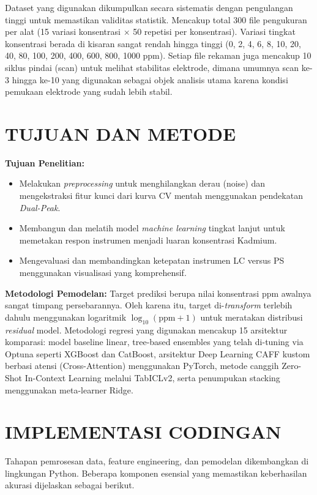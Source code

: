 \documentclass[10pt, twocolumn, a4paper]{article}
\begin{document}
Dataset yang digunakan dikumpulkan secara sistematis dengan pengulangan tinggi untuk memastikan validitas statistik. Mencakup total 300 file pengukuran per alat (15 variasi konsentrasi $\times$ 50 repetisi per konsentrasi). Variasi tingkat konsentrasi berada di kisaran sangat rendah hingga tinggi (0, 2, 4, 6, 8, 10, 20, 40, 80, 100, 200, 400, 600, 800, 1000 ppm). Setiap file rekaman juga mencakup 10 siklus pindai (scan) untuk melihat stabilitas elektrode, dimana umumnya scan ke-3 hingga ke-10 yang digunakan sebagai objek analisis utama karena kondisi pemukaan elektrode yang sudah lebih stabil.

\section{TUJUAN DAN METODE}
\textbf{Tujuan Penelitian:}
\begin{itemize}
    \item Melakukan \textit{preprocessing} untuk menghilangkan derau (noise) dan mengekstraksi fitur kunci dari kurva CV mentah menggunakan pendekatan \textit{Dual-Peak}.
    \item Membangun dan melatih model \textit{machine learning} tingkat lanjut\cite{sklearn} untuk memetakan respon instrumen menjadi luaran konsentrasi Kadmium.
    \item Mengevaluasi dan membandingkan ketepatan instrumen LC versus PS menggunakan visualisasi yang komprehensif.
\end{itemize}

\textbf{Metodologi Pemodelan:}
Target prediksi berupa nilai konsentrasi ppm awalnya sangat timpang persebarannya. Oleh karena itu, target di-\textit{transform} terlebih dahulu menggunakan logaritmik $\log_{10}(\text{ppm} + 1)$ untuk meratakan distribusi \textit{residual} model. Metodologi regresi yang digunakan mencakup 15 arsitektur komparasi: model baseline linear, tree-based ensembles yang telah di-tuning via Optuna\cite{optuna} seperti XGBoost\cite{xgboost} dan CatBoost, arsitektur Deep Learning CAFF kustom berbasi atensi (Cross-Attention) menggunakan PyTorch\cite{pytorch}, metode canggih Zero-Shot In-Context Learning melalui TabICLv2\cite{tabicl}, serta penumpukan stacking menggunakan meta-learner Ridge.

\section{IMPLEMENTASI CODINGAN}
Tahapan pemrosesan data, feature engineering, dan pemodelan dikembangkan di lingkungan Python. Beberapa komponen esensial yang memastikan keberhasilan akurasi dijelaskan sebagai berikut.
\end{document}
